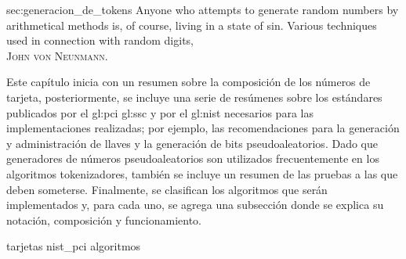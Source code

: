 %
%
%

{sec:generacion_de_tokens}
{
  \epigrafe
  {%
    Anyone who attempts to generate random numbers by arithmetical methods is,
    of course, living in a state of sin.%
  }
  {%
    Various techniques used in connection with random digits, \\
    \textsc{John von Neunmann}.%
  }
}

\noindent
Este capítulo inicia con un resumen sobre la composición de los números de
tarjeta, posteriormente, se incluye una serie de resúmenes sobre los estándares
publicados por el \gls{gl:pci} \gls{gl:ssc} y por el \gls{gl:nist} necesarios
para las implementaciones realizadas; por ejemplo, las recomendaciones para la
generación y administración de llaves y la generación de bits pseudoaleatorios.
Dado que generadores de números pseudoaleatorios son utilizados frecuentemente
en los algoritmos tokenizadores, también se incluye un resumen de las pruebas a
las que deben someterse. Finalmente, se clasifican los algoritmos que serán
implementados y, para cada uno, se agrega una subsección donde se explica su
notación, composición y funcionamiento.

{tarjetas}
{nist_pci}
{algoritmos}
